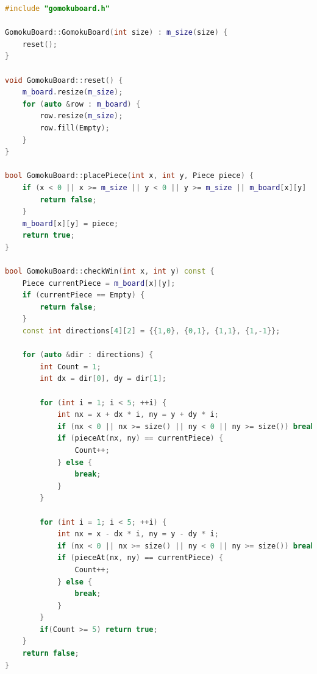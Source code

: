 \documentclass[UTF8]{ctexart}
\begin{document}
\begin{lstlisting}[language=C++]
#include "gomokuboard.h"

GomokuBoard::GomokuBoard(int size) : m_size(size) {
	reset();
}

void GomokuBoard::reset() {
	m_board.resize(m_size);
	for (auto &row : m_board) {
		row.resize(m_size);
		row.fill(Empty);
	}
}

bool GomokuBoard::placePiece(int x, int y, Piece piece) {
	if (x < 0 || x >= m_size || y < 0 || y >= m_size || m_board[x][y] != Empty) {
		return false;
	}
	m_board[x][y] = piece;
	return true;
}

bool GomokuBoard::checkWin(int x, int y) const {
    Piece currentPiece = m_board[x][y];
    if (currentPiece == Empty) {
        return false;
    }
    const int directions[4][2] = {{1,0}, {0,1}, {1,1}, {1,-1}};
    
    for (auto &dir : directions) {
        int Count = 1;
        int dx = dir[0], dy = dir[1];

        for (int i = 1; i < 5; ++i) {
            int nx = x + dx * i, ny = y + dy * i;
            if (nx < 0 || nx >= size() || ny < 0 || ny >= size()) break;
            if (pieceAt(nx, ny) == currentPiece) {
                Count++;
            } else {
                break;
            }
        }

        for (int i = 1; i < 5; ++i) {
            int nx = x - dx * i, ny = y - dy * i;
            if (nx < 0 || nx >= size() || ny < 0 || ny >= size()) break;
            if (pieceAt(nx, ny) == currentPiece) {
                Count++;
            } else {
                break;
            }
        }
        if(Count >= 5) return true;
    }
    return false;
}
\end{lstlisting}
\end{document}
